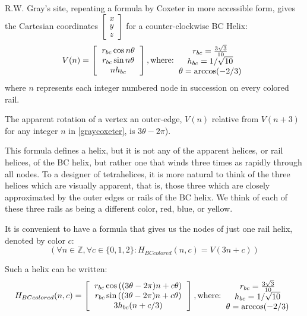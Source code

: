 \documentclass[11pt]{article}
\begin{document}
R.W. Gray's site\cite{graytetrahelix}, repeating a formula by Coxeter\cite{coxeter1985simplicial} in more accessible form, gives the Cartesian coordinates $\begin{bmatrix}
           x \\
           y \\
           z
         \end{bmatrix}$
for a counter-clockwise BC Helix:
\begin{equation}
  \label{graycoxeter}
V(n) =
\left [
  \begin{tabular}{c}
   $ r_{bc} \cos{n \theta} $\\
   $ r_{bc} \sin{n \theta} $\\
   $ n h_{bc}  $
  \end{tabular}
  \right ],
\text{where:}
  \begin{tabular}{c}
 $ r_{bc} = \frac{3\sqrt{3}}{10} $\\
 $ h_{bc} = 1/\sqrt{10} $ \\
 $ \theta = \arccos(-2/3) $ \\
  \end{tabular}      
\end{equation}
where $n$ represents each integer numbered node in succession on every colored rail.

The apparent rotation of a vertex an outer-edge, $V(n)$ relative from $V(n+3)$ for any integer $n$
in \eqref{graycoxeter}, is $3 \theta - 2\pi$).

This formula defines a helix, but it is not any of the apparent helices, or rail helices, of the
BC helix, but rather one that winds three times as rapidly through all
nodes. To a designer of tetrahelices, it is more natural to think of
the three helices which are visually apparent, that is, those three
which are closely approximated by the outer edges or rails of
the BC helix. We think of each of these three rails as being a different color, red, blue, or yellow.

It is convenient to have a formula that gives us the nodes of just
one rail helix, denoted by color $c$:
\[
(\forall n \in \mathbb{Z}, \forall c \in \{0,1,2\} : H_{BCcolored}(n,c) = V(3n +c))
\]

Such a helix can be written:
\begin{equation}
  \label{eq:colored}
H_{BCcolored}(n,c) =
\left [
  \begin{tabular}{c}
   $ r_{bc}  \cos{((3 \theta - 2 \pi)n + c  \theta)} $\\
   $ r_{bc} \sin{((3 \theta - 2 \pi)n + c  \theta)} $\\
   $ 3 h_{bc} (n + c/3)  $
  \end{tabular}
  \right ],
\text{where:}
  \begin{tabular}{c}
 $ r_{bc} = \frac{3\sqrt{3}}{10} $\\
 $ h_{bc} = 1/\sqrt{10} $ \\
 $ \theta = \arccos(-2/3) $ \\
  \end{tabular}      
\end{equation}
\end{document}
